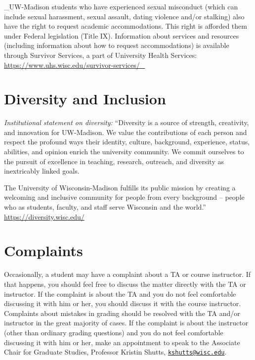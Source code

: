 \documentclass[11pt,man]{article}
\begin{document}
\_UW-Madison students who have experienced sexual misconduct (which can
include sexual harassment, sexual assault, dating violence and/or
stalking) also have the right to request academic accommodations. This
right is afforded them under Federal legislation (Title IX). Information
about services and resources (including information about how to request
accommodations) is available through Survivor Services, a part of
University Health Services:
\url{https://www.uhs.wisc.edu/survivor-services/_}

\hypertarget{diversity-and-inclusion}{%
\section{Diversity and Inclusion}\label{diversity-and-inclusion}}

\emph{Institutional statement on diversity:} ``Diversity is a source of
strength, creativity, and innovation for UW-Madison. We value the
contributions of each person and respect the profound ways their
identity, culture, background, experience, status, abilities, and
opinion enrich the university community. We commit ourselves to the
pursuit of excellence in teaching, research, outreach, and diversity as
inextricably linked goals.

The University of Wisconsin-Madison fulfills its public mission by
creating a welcoming and inclusive community for people from every
background -- people who as students, faculty, and staff serve Wisconsin
and the world.'' \url{https://diversity.wisc.edu/}

\hypertarget{complaints}{%
\section{Complaints}\label{complaints}}

Occasionally, a student may have a complaint about a TA or course
instructor. If that happens, you should feel free to discuss the matter
directly with the TA or instructor. If the complaint is about the TA and
you do not feel comfortable discussing it with him or her, you should
discuss it with the course instructor. Complaints about mistakes in
grading should be resolved with the TA and/or instructor in the great
majority of cases. If the complaint is about the instructor (other than
ordinary grading questions) and you do not feel comfortable discussing
it with him or her, make an appointment to speak to the Associate Chair
for Graduate Studies, Professor Kristin Shutts,
\href{mailto:kshutts@wisc.edu}{\nolinkurl{kshutts@wisc.edu}}.
\end{document}
